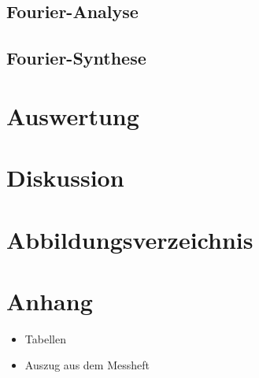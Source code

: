 \documentclass[11pt,ngerman,a4paper]{article}
\begin{document}
\subsection{Fourier-Analyse}
\subsection{Fourier-Synthese}
\section{Auswertung}

\section{Diskussion}
\section{Abbildungsverzeichnis}
\section{Anhang}
\begin{itemize}
\item Tabellen
\item Auszug aus dem Messheft
\end{itemize}

\newpage
\end{document}
